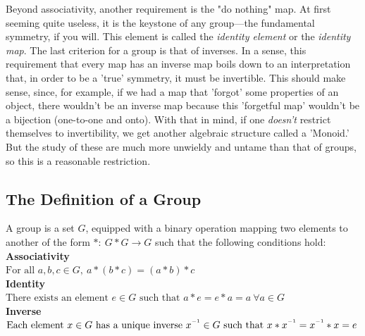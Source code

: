\documentclass[11pt,a4paper]{article}
\newcommand{\inv}{^{\raisebox{.2em}{$\scriptscriptstyle-1$}}}
\begin{document}
Beyond associativity, another requirement is the "do nothing" map. At first seeming quite useless, it is the keystone of any group—the fundamental symmetry, if you will. This element is called the \textit{identity element} or the \textit{identity map}. The last criterion for a group is that of inverses. In a sense, this requirement that every map has an inverse map boils down to an interpretation that, in order to be a 'true' symmetry, it must be invertible. This should make sense, since, for example, if we had a map that 'forgot' some properties of an object, there wouldn't be an inverse map because this 'forgetful map' wouldn't be a bijection (one-to-one and onto). With that in mind, if one \textit{doesn't} restrict themselves to invertibility, we get another algebraic structure called a 'Monoid.' But the study of these are much more unwieldy and untame than that of groups, so this is a reasonable restriction.

\subsection{The Definition of a Group}
  A group is a set $G$, equipped with a binary operation mapping two elements to another of the form $\ast:\ G \ast G \to G$ such that the following conditions hold:\autocite[16]{saracino}
\\\textbf{Associativity}
\\$\text{For all } a,b,c \in G,\ a\ast(b \ast c) = (a\ast b) \ast c$
\\\textbf{Identity}
\\$\text{There exists an element } e \in G \text{ such that } a \ast e = e \ast a = a \ \forall a \in G$
\\\textbf{Inverse}
\\$\text{Each element } x \in G \text{ has a unique inverse } x\inv \in G \text{ such that } x \ast x\inv = x\inv \ast x = e$
\end{document}
